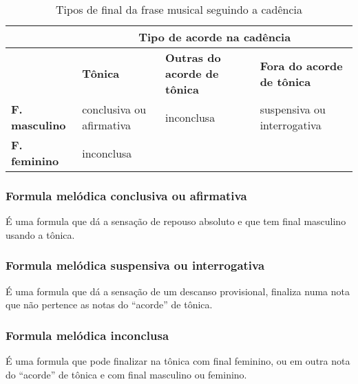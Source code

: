 \begin{table}[!h]
  \centering
  \begin{tabular}{|l||p{3cm}|p{2.5cm}|p{3.5cm}|}
  \hline
  ~                      &  \multicolumn{3}{c|}{\textbf{Tipo de acorde na cadência}} \\ \hline
  ~                      & \textbf{Tônica} & \textbf{Outras do acorde de tônica} & \textbf{Fora do acorde de tônica} \\ \hline \hline
  \textbf{F. masculino}  & conclusiva ou afirmativa  & inconclusa & suspensiva ou interrogativa  \\ \cline{1-2}
  \textbf{F. feminino}   & inconclusa                & ~ & ~   \\ \hline
  \end{tabular}  
  \caption{Tipos de final da frase musical seguindo a cadência}
  \label{tab:tablefinaltipo}
\end{table}

\subsubsection{Formula melódica conclusiva ou afirmativa}
É uma formula que dá a sensação de repouso absoluto
e que tem final masculino usando a tônica.

\subsubsection{Formula melódica suspensiva ou interrogativa}
É uma formula que dá a sensação de um descanso provisional,
finaliza numa nota que não pertence as notas do ``acorde'' de tônica. 

\subsubsection{Formula melódica inconclusa}
É uma formula que pode finalizar na tônica com final feminino, ou
em outra nota do ``acorde'' de tônica e com final masculino ou feminino.
